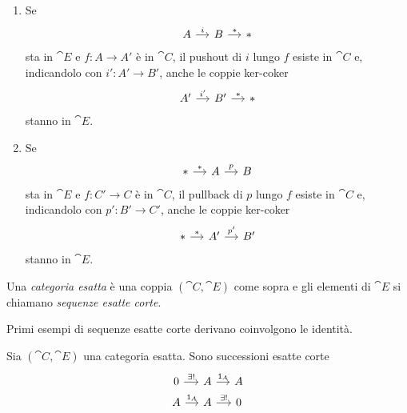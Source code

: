 \begin{definition}
\begin{enumerate}[leftmargin=*, label=(E\arabic*),
    ref=Definizione~\ref{definition:CategorieEsatte}-E\arabic*]
\[\begin{tikzcd}[column sep=small]
      \end{tikzcd}
    \]
    stanno in \(\cat E\).
  \item \label{item:E2} Se
    \[
      \begin{tikzcd}[column sep=small]
        A \ar["{i}", r] & B \ar["{\ast}", r] & \ast
      \end{tikzcd}
    \]
    sta in \(\cat E\) e \(f : A \to A'\) è in \(\cat C\), il pushout di
    \(i\) lungo \(f\) esiste in \(\cat C\) e, indicandolo con
    \(i' : A' \to B'\), anche le coppie ker-coker
    \[
      \begin{tikzcd}[column sep=small]
        A' \ar["{i'}", r] & B' \ar["{\ast}", r] & \ast
      \end{tikzcd}
    \]
    stanno in \(\cat E\).
  \item \label{item:E2op} Se
    \[
      \begin{tikzcd}[column sep=small]
        \ast \ar["{\ast}", r] & A \ar["{p}", r] & B
      \end{tikzcd}
    \]
    sta in \(\cat E\) e \(f : C' \to C\) è in \(\cat C\), il pullback di
    \(p\) lungo \(f\) esiste in \(\cat C\) e, indicandolo con
    \(p' : B' \to C'\), anche le coppie ker-coker
    \[
      \begin{tikzcd}[column sep=small]
        \ast \ar["{\ast}", r] & A' \ar["{p'}", r] & B'
      \end{tikzcd}
    \]
    stanno in \(\cat E\).
  \end{enumerate}
  Una {\em categoria esatta} è una coppia \((\cat C,\cat E)\) come sopra
  e gli elementi di \(\cat E\) si chiamano {\em sequenze esatte corte}.
\end{definition}

Primi esempi di sequenze esatte corte derivano coinvolgono le identità.

\begin{proposition}\label{proposition:ExactId}
  Sia \((\cat C,\cat E)\) una categoria esatta. Sono successioni esatte
  corte
  \[
    \begin{tikzcd}[row sep=tiny, column sep=small]
      0 \ar["{\exists!}", r] & A \ar["{\id_A}", r] & A \\
      A \ar["{\id_A}", r] & A \ar["{\exists!}", r] & 0
    \end{tikzcd}
  \]
\end{proposition}


